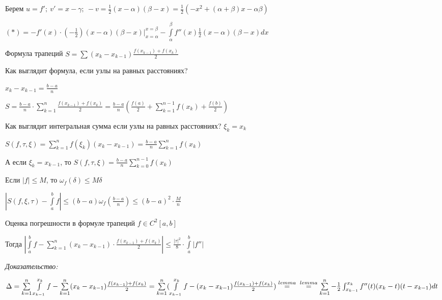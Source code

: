 \documentclass[12pt]{article}
\begin{document}
Берем $u = f';\ v' = x - \gamma;\ -v = \frac{1}{2}(x - \alpha)(\beta - x) = \frac{1}{2}(-x^2 + (\alpha + \beta)x - \alpha\beta)$

$(*) = -f'(x) \cdot (- \frac{1}{2})(x - \alpha)(\beta - x)|_{x = \alpha}^{x = \beta} - \int\limits_\alpha^\beta f''(x) \frac{1}{2} (x - \alpha)(\beta - x)dx$

\begin{theo}{Формула трапеций}
    $S = \sum (x_k - x_{k - 1})\frac{f(x_{k - 1}) + f(x_k)}{2}$

    Как выглядит формула, если узлы на равных расстояниях?

    $x_k - x_{k - 1} = \frac{b - a}{n}$

    $S = \frac{b - a}{n} \cdot \sum\limits_{k = 1}^n \frac{f(x_{k - 1}) + f(x_k)}{2} = \frac{b - a}{n} (\frac{f(a)}{2} + \sum\limits_{k = 1}^{n - 1} f(x_k) + \frac{f(b)}{2})$
\end{theo}

\begin{nota}{Как выглядит интегральная сумма если узлы на равных расстояниях?}
    $\xi_k = x_k$

    $S(f, \tau, \xi) = \sum\limits_{k = 1}^n f(\xi_k)(x_k - x_{k - 1}) = \frac{b - a}{n}\sum\limits_{k = 1}^n f(x_k)$

    А если $\xi_k = x_{k - 1}$, то $S(f, \tau, \xi) = \frac{b - a}{n} \sum\limits_{k = 0}^{n - 1}f(x_k)$

\begin{Remark}{}
    Если $|f| \leq M$, то $\omega_f(\delta) \leq M\delta$

    $|S(f, \xi, \tau) - \int\limits_a^b f| \leq (b - a)\omega_f(\frac{b - a}{n}) \leq (b - a)^2 \cdot \frac{M}{n}$
\end{Remark}

\end{nota}

\begin{theo}{Оценка погрешности в формуле трапеций}
    $f \in C^2[a, b]$

    Тогда $|\int\limits_a^b f - \sum\limits_{k = 1}^n(x_k - x_{k - 1}) \cdot \frac{f(x_{k - 1}) + f(x_k)}{2}| \leq \frac{|\tau|^2}{8} \cdot \int\limits_a^b |f''|$
\end{theo}

\newpage

\textit{Доказательство:}

$\Delta = \sum\limits_{k = 1}^n \int\limits_{x_{k - 1}}^{x_k} f - \sum\limits_{k = 1}^n (x_k - x_{k - 1}) \frac{f(x_{k - 1}) + f(x_k)}{2} = \sum\limits_{k = 1}^n (\int\limits_{x_{k - 1}}^{x_k} f - (x_k - x_{k - 1}) \frac{f(x_{k - 1}) + f(x_k)}{2}) \stackrel{lemma}{=} \\ \stackrel{lemma}{=} \sum\limits_{k = 1}^n - \frac{1}{2}\int_{x_{k - 1}}^{x_k} f''(t)(x_k - t)(t - x_{k - 1})dt$
\end{document}
